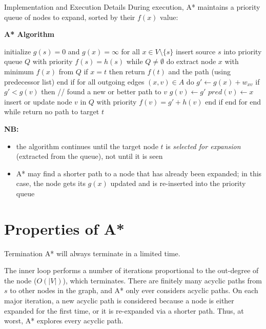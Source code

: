 \documentclass[a4paper, 11pt]{report}
\begin{document}
\begin{gframe}{Implementation and Execution Details}
During execution, A* maintains a priority queue of nodes to expand, sorted by their $f(x)$ value:

\textbf{A* Algorithm}

\begin{pseudocode}
initialize $g(s) = 0$ and $g(x) = \infty$ for all $x \in V \setminus \{s\}$
insert source $s$ into priority queue $Q$ with priority $f(s) = h(s)$
while $Q \neq \emptyset$ do
    extract node $x$ with minimum $f(x)$ from $Q$
    if $x = t$ then
        return $f(t)$ and the path (using predecessor list)
    end if
    for all outgoing edges $(x, v) \in A$ do
        $g' \gets g(x) + w_{xv}$
        if $g' < g(v)$ then // found a new or better path to $v$
            $g(v) \gets g'$
            $pred(v) \gets x$
            insert or update node $v$ in $Q$ with priority $f(v) = g' + h(v)$
        end if
    end for
end while
return no path to target $t$
\end{pseudocode}

\textbf{NB:} 
\begin{itemize}
    \item the algorithm continues until the target node $t$ is \textit{selected for expansion} (extracted from the queue), not until it is seen
    \item A* may find a shorter path to a node that has already been expanded; in this case, the node gets its $g(x)$ updated and is re-inserted into the priority queue
\end{itemize}
\end{gframe}

\section{Properties of A*}

\begin{thmframe}{Termination}{}
    A* will always terminate in a limited time.
\end{thmframe}
\begin{proofframe}
    The inner loop performs a number of iterations proportional to the out-degree of the node ($O(|V|)$), which terminates. There are finitely many acyclic paths from $s$ to other nodes in the graph, and A* only ever considers acyclic paths. On each major iteration, a new acyclic path is considered because a node is either expanded for the first time, or it is re-expanded via a shorter path. Thus, at worst, A* explores every acyclic path.
\end{proofframe}
\end{document}
